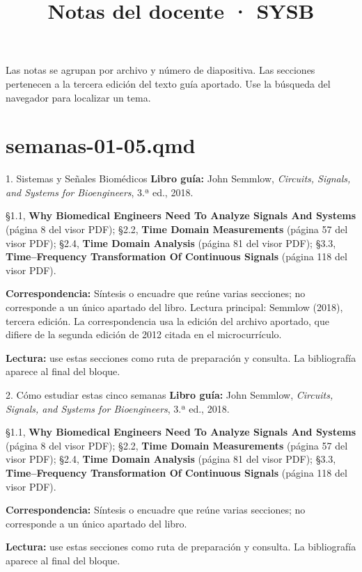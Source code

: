 \documentclass[
  10pt,
  ignorenonframetext,
  aspectratio=169,
  spanish,
]{beamer}
\title{Notas del docente · SYSB}
\author{}
\date{}
\begin{document}
\frame{\titlepage}


\begin{frame}
Las notas se agrupan por archivo y número de diapositiva. Las secciones
pertenecen a la tercera edición del texto guía aportado. Use la búsqueda
del navegador para localizar un tema.
\end{frame}

\section{semanas-01-05.qmd}\label{semanas-01-05.qmd}

\begin{frame}{1. Sistemas y Señales Biomédicos}
\label{sistemas-y-seuxf1ales-biomuxe9dicos}
\textbf{Libro guía:} John Semmlow, \emph{Circuits, Signals, and Systems
for Bioengineers}, 3.ª ed., 2018.

§1.1, \textbf{Why Biomedical Engineers Need To Analyze Signals And
Systems} (página 8 del visor PDF); §2.2, \textbf{Time Domain
Measurements} (página 57 del visor PDF); §2.4, \textbf{Time Domain
Analysis} (página 81 del visor PDF); §3.3, \textbf{Time--Frequency
Transformation Of Continuous Signals} (página 118 del visor PDF).

\textbf{Correspondencia:} Síntesis o encuadre que reúne varias
secciones; no corresponde a un único apartado del libro. Lectura
principal: Semmlow (2018), tercera edición. La correspondencia usa la
edición del archivo aportado, que difiere de la segunda edición de 2012
citada en el microcurrículo.

\textbf{Lectura:} use estas secciones como ruta de preparación y
consulta. La bibliografía aparece al final del bloque.
\end{frame}

\begin{frame}{2. Cómo estudiar estas cinco semanas}
\label{cuxf3mo-estudiar-estas-cinco-semanas}
\textbf{Libro guía:} John Semmlow, \emph{Circuits, Signals, and Systems
for Bioengineers}, 3.ª ed., 2018.

§1.1, \textbf{Why Biomedical Engineers Need To Analyze Signals And
Systems} (página 8 del visor PDF); §2.2, \textbf{Time Domain
Measurements} (página 57 del visor PDF); §2.4, \textbf{Time Domain
Analysis} (página 81 del visor PDF); §3.3, \textbf{Time--Frequency
Transformation Of Continuous Signals} (página 118 del visor PDF).

\textbf{Correspondencia:} Síntesis o encuadre que reúne varias
secciones; no corresponde a un único apartado del libro.

\textbf{Lectura:} use estas secciones como ruta de preparación y
consulta. La bibliografía aparece al final del bloque.
\end{frame}
\end{document}

